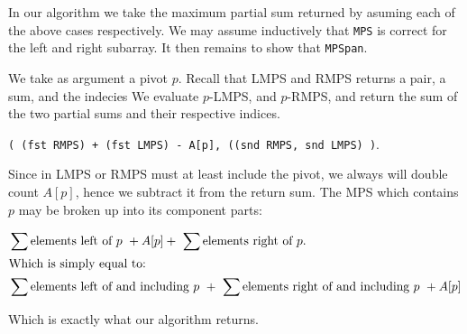 \documentclass{amsart}
\theoremstyle{definition}
\theoremstyle{remark}
\numberwithin{equation}{section}
\begin{document}
In our algorithm we take the maximum partial sum returned by asuming
each of the above cases respectively. We may assume inductively that
\texttt{MPS} is correct for the left and right subarray. It then remains
to show that \texttt{MPSpan}.


We take as argument a pivot $p$.
Recall that LMPS and RMPS returns a pair, a sum, and the indecies
We evaluate $p$-LMPS, and $p$-RMPS, and return the sum of the two
partial sums and their respective indices.

\texttt{( (fst RMPS) + (fst LMPS) - A[p], ((snd RMPS, snd LMPS) )}.

\proof

Since in LMPS or RMPS must at least include the pivot, we always will double
count $A[p]$, hence we subtract it from the return sum. The MPS which contains
$p$ may be broken up into its component parts:

\begin{align*}
  &\sum{\text{elements left of $p$}}\ + A[p] +\ \sum{\text{elements right of $p$}}. \\
  \intertext{Which is simply equal to:}
  &\sum{\text{elements left of and including $p$}}\ +\ \sum{\text{elements right of and including $p$}}\ + A[p]
\end{align*}

Which is exactly what our algorithm returns.
\end{document}
